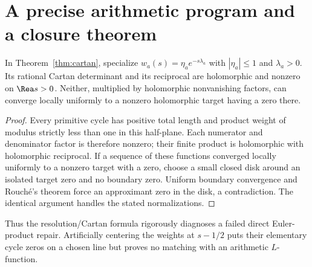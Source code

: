 \section{A precise arithmetic program and a closure theorem}
\begin{proposition}\label{prop:nogo}
In Theorem~\ref{thm:cartan}, specialize $w_a(s)=\eta_a e^{-s\lambda_a}$ with $|\eta_a|\leq1$ and $\lambda_a>0$. Its rational Cartan determinant and its reciprocal are holomorphic and nonzero on $\Rea s>0$. Neither, multiplied by holomorphic nonvanishing factors, can converge locally uniformly to a nonzero holomorphic target having a zero there.
\end{proposition}
\begin{proof}
Every primitive cycle has positive total length and product weight of modulus strictly less than one in this half-plane. Each numerator and denominator factor is therefore nonzero; their finite product is holomorphic with holomorphic reciprocal. If a sequence of these functions converged locally uniformly to a nonzero target with a zero, choose a small closed disk around an isolated target zero and no boundary zero. Uniform boundary convergence and Rouch\'e's theorem force an approximant zero in the disk, a contradiction. The identical argument handles the stated normalizations.
\end{proof}
Thus the resolution/Cartan formula rigorously diagnoses a failed direct Euler-product repair. Artificially centering the weights at $s-1/2$ puts their elementary cycle zeros on a chosen line but proves no matching with an arithmetic $L$-function.

